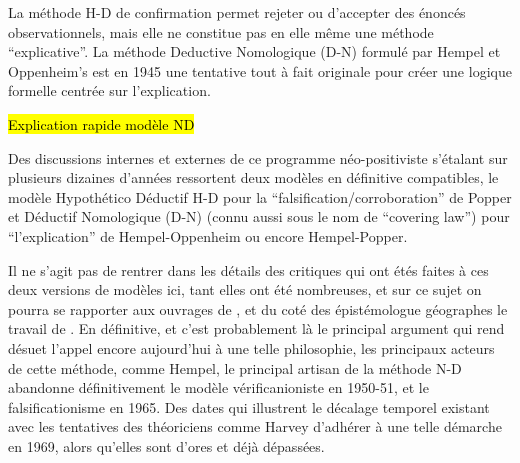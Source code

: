 La méthode H-D de confirmation permet rejeter ou d'accepter des énoncés observationnels, mais elle ne constitue pas en elle même une méthode \enquote{explicative}. La méthode Deductive Nomologique (D-N) formulé par Hempel et Oppenheim’s  est en 1945 une tentative tout à fait originale pour créer une logique formelle centrée sur l'explication.

\hl{Explication rapide modèle ND}

Des discussions internes et externes de ce programme néo-positiviste s'étalant sur plusieurs dizaines d'années ressortent deux modèles en définitive compatibles, le modèle Hypothético Déductif H-D pour la \enquote{falsification/corroboration} de Popper et Déductif Nomologique (D-N) (connu aussi sous le nom de \foreignquote{english}{covering law}) pour \enquote{l'explication} de Hempel-Oppenheim ou encore Hempel-Popper.

Il ne s'agit pas de rentrer dans les détails des critiques qui ont étés faites à ces deux versions de modèles ici, tant elles ont été nombreuses, et sur ce sujet on pourra se rapporter aux ouvrages de \textcite{Chalmers1987}, \textcite[214-215]{Meyer1979} et du coté des épistémologue géographes le travail de \autocite{Besse2000}. En définitive, et c'est probablement là le principal argument qui rend désuet l'appel encore aujourd'hui à une telle philosophie, les principaux acteurs de cette méthode, comme Hempel, le principal artisan de la méthode N-D abandonne définitivement le modèle vérificanioniste en 1950-51, et le falsificationisme en 1965. Des dates qui illustrent le décalage temporel existant avec les tentatives des théoriciens comme Harvey d'adhérer à une telle démarche en 1969, alors qu'elles sont d'ores et déjà dépassées.


